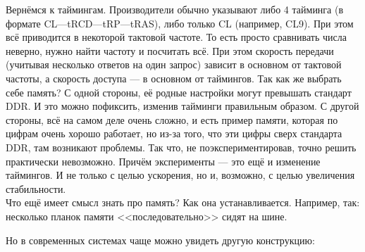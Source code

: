 \documentclass{article}
\begin{document}
    Вернёмся к таймингам. Производители обычно указывают либо 4 тайминга (в формате CL---tRCD---tRP---tRAS), либо только CL (например, CL9). При этом всё приводится в некоторой тактовой частоте. То есть просто сравнивать числа неверно, нужно найти частоту и посчитать всё. При этом скорость передачи (учитывая несколько ответов на один запрос) зависит в основном от тактовой частоты, а скорость доступа --- в основном от таймингов. Так как же выбрать себе память? С одной стороны, её родные настройки могут превышать стандарт DDR. И это можно пофиксить, изменив тайминги правильным образом. С другой стороны, всё на самом деле очень сложно, и есть пример памяти, которая по цифрам очень хорошо работает, но из-за того, что эти цифры сверх стандарта DDR, там возникают проблемы. Так что, не поэкспериментировав, точно решить практически невозможно. Причём эксперименты --- это ещё и изменение таймингов. И не только с целью ускорения, но и, возможно, с целью увеличения стабильности.\\
    Что ещё имеет смысл знать про память? Как она устанавливается. Например, так: несколько планок памяти <<последовательно>> сидят на шине.
    \begin{center}
    \end{center}
    Но в современных системах чаще можно увидеть другую конструкцию:
    \begin{center}
    \end{center}
\end{document}
